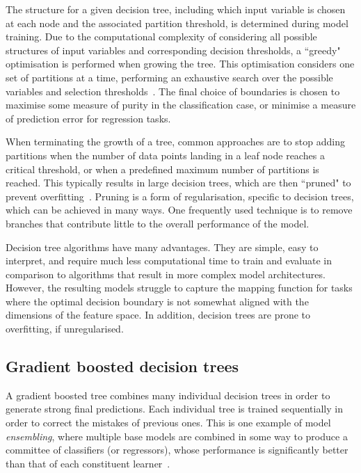 The structure for a given decision tree, including which input variable is chosen at each node and the associated partition threshold, is determined during model training. Due to the computational complexity of considering all possible structures of input variables and corresponding decision thresholds, a ``greedy" optimisation is performed when growing the tree. This optimisation considers one set of partitions at a time, performing an exhaustive search over the possible variables and selection thresholds~\cite{patternRecognitionAndML}. The final choice of boundaries is chosen to maximise some measure of purity in the classification case, or minimise a measure of prediction error for regression tasks. %

When terminating the growth of a tree, common approaches are to stop adding partitions when the number of data points landing in a leaf node reaches a critical threshold, or when a predefined maximum number of partitions is reached. This typically results in large decision trees, which are then ``pruned" to prevent overfitting~\cite{patternRecognitionAndML}. Pruning is a form of regularisation, specific to decision trees, which can be achieved in many ways. One frequently used technique is to remove branches that contribute little to the overall performance of the model.

Decision tree algorithms have many advantages. They are simple, easy to interpret, and require much less computational time to train and evaluate in comparison to algorithms that result in more complex model architectures. However, the resulting models struggle to capture the mapping function for tasks where the optimal decision boundary is not somewhat aligned with the dimensions of the feature space. In addition, decision trees are prone to overfitting, if unregularised.

\subsection{Gradient boosted decision trees} 

A gradient boosted tree combines many individual decision trees in order to generate strong final predictions. 
Each individual tree is trained sequentially in order to correct the mistakes of previous ones.
This is one example of model \textit{ensembling}, where multiple base models are combined in some way to produce a committee of classifiers (or regressors), whose performance is significantly better than that of each constituent learner~\cite{weak_learners,patternRecognitionAndML}. 

